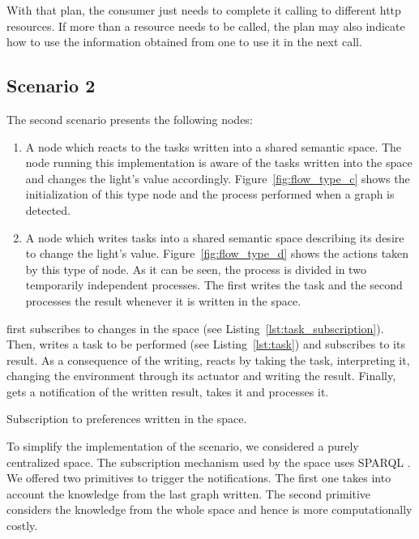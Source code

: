 With that plan, the consumer just needs to complete it calling to different \acs{http} resources.
If more than a resource needs to be called, the plan may also indicate how to use the information obtained from one to use it in the next call.


\subsection{Scenario 2}
\label{sec:actuation_scn2}


The second scenario presents the following nodes:
\begin{enumerate}[resume,label=\itshape(\alph*\upshape)]
  \item A node which reacts to the tasks written into a shared semantic space.
	The node running this implementation is aware of the tasks written into the space and changes the light's value accordingly. %
	Figure~\ref{fig:flow_type_c} shows the initialization of this type node and the process performed when a graph is detected.
	
  \item A node which writes tasks into a shared semantic space describing its desire to change the light's value.
	Figure~\ref{fig:flow_type_d} shows the actions taken by this type of node.
	As it can be seen, the process is divided in two temporarily independent processes.
	The first writes the task and the second processes the result whenever it is written in the space.
\end{enumerate}


\nodec{} first subscribes to changes in the space (see Listing~\ref{lst:task_subscription}).
Then, \noded{} writes a task to be performed (see Listing~\ref{lst:task}) and subscribes to its result.
As a consequence of the writing, \nodec{} reacts by taking the task, interpreting it, changing the environment through its actuator and writing the result.
Finally, \noded{} gets a notification of the written result, takes it and processes it.


\begin{listing}
  
  \caption{Subscription to preferences written in the space.}
  \label{lst:task_subscription}
\end{listing}


To simplify the implementation of the scenario, we considered a purely centralized space.
The subscription mechanism used by the space uses SPARQL .
We offered two primitives to trigger the notifications.
The first one takes into account the knowledge from the last graph written.
The second primitive considers the knowledge from the whole space and hence is more computationally costly.

